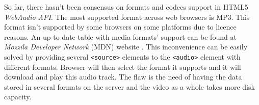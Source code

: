 So far, there hasn't been consensus on formats and codecs support in HTML5 \textit{WebAudio API}. The most supported format across web browsers is MP3. This format isn't supported by some browsers on some platforms due to licence reasons. An up-to-date table with media formats' support can be found at \textit{Mozzila Developer Network} (MDN) website  \cite{mdn_audio_formats}. This inconvenience can be easily solved by providing several \verb|<source>| elements to the \verb|<audio>| element with different formats. Browser will then select the format it supports and it will download and play this audio track. The flaw is the need of having the data stored in several formats on the server and the video as a whole takes more disk capacity.

\vfill

